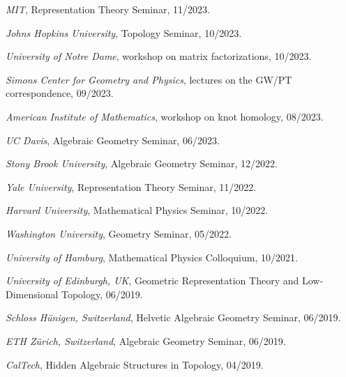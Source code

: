\documentclass[11pt]{article}
\begin{document}
\begin{cvlist}
  \item \emph{MIT}, Representation Theory Seminar, 11/2023.
  \item \emph{Johns Hopkins University}, Topology Seminar, 10/2023.
  \item \emph{University of Notre Dame}, workshop on matrix factorizations,
    10/2023.
  \item \emph{Simons Center for Geometry and Physics}, lectures on the GW/PT
    correspondence, 09/2023.
  \item \emph{American Institute of Mathematics}, workshop on knot homology,
    08/2023.
  \item \emph{UC Davis}, Algebraic Geometry Seminar, 06/2023.
\end{cvlist}

\begin{cvlist}
  \item \emph{Stony Brook University}, Algebraic Geometry Seminar, 12/2022.
  \item \emph{Yale University}, Representation Theory Seminar, 11/2022.
  \item \emph{Harvard University}, Mathematical Physics Seminar, 10/2022.
  \item \emph{Washington University}, Geometry Seminar, 05/2022.
\end{cvlist}

\begin{cvlist}
  \item \emph{University of Hamburg}, Mathematical Physics Colloquium,
    10/2021.
\end{cvlist}

\begin{cvlist}
  \item \emph{University of Edinburgh, UK}, Geometric Representation Theory
    and Low-Dimensional Topology, 06/2019.
  \item \emph{Schloss H\"unigen, Switzerland}, Helvetic Algebraic Geometry
    Seminar, 06/2019.
  \item \emph{ETH Z\"urich, Switzerland}, Algebraic Geometry Seminar,
    06/2019.
  \item \emph{CalTech}, Hidden Algebraic Structures in Topology, 04/2019.
\end{cvlist}
\end{document}

